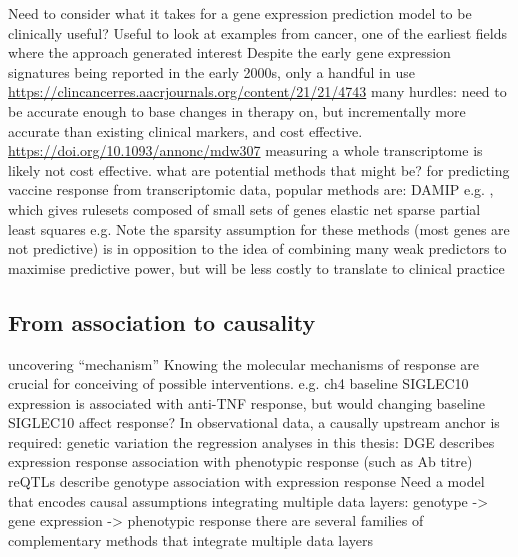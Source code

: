 \begin{outline}
\1 Need to consider what it takes for a gene expression prediction model to be clinically useful?
    \2 Useful to look at examples from cancer, one of the earliest fields where the approach generated interest
    \2 Despite the early gene expression signatures being reported in the early 2000s, only a handful in use \autocite{chibon2013CancerGeneExpression} \url{https://clincancerres.aacrjournals.org/content/21/21/4743}
    \2 many hurdles: need to be accurate enough to base changes in therapy on, but incrementally more accurate than existing clinical markers, and cost effective. \url{https://doi.org/10.1093/annonc/mdw307}
    \2 measuring a whole transcriptome is likely not cost effective. what are potential methods that might be?
    \2 for predicting vaccine response from transcriptomic data, popular methods are:
        \3 DAMIP e.g. \autocite{querec2009SystemsBiologyApproach}, which gives rulesets composed of small sets of genes
        \3 elastic net
        \3 sparse partial least squares e.g. \autocite{tsang2014GlobalAnalysesHuman} 
    \2 Note the sparsity assumption for these methods (most genes are not predictive) is in opposition to the idea of combining many weak predictors to maximise predictive power, but will be less costly to translate to clinical practice

\subsection{From association to causality}

\1 uncovering \enquote{mechanism}
    \2 Knowing the molecular mechanisms of response are crucial for conceiving of possible interventions.
        \3 e.g. ch4 baseline SIGLEC10 expression is associated with anti-TNF response, but would changing baseline SIGLEC10 affect response?
    \2 In observational data, a causally upstream anchor is required: genetic variation
    \2 the regression analyses in this thesis:
        \3 DGE describes expression response association with phenotypic response (such as Ab titre) 
        \3 reQTLs describe genotype association with expression response
    \2 Need a model that encodes causal assumptions integrating multiple data layers: genotype -> gene expression -> phenotypic response
    \2 there are several families of complementary methods that integrate multiple data layers


\end{outline}
